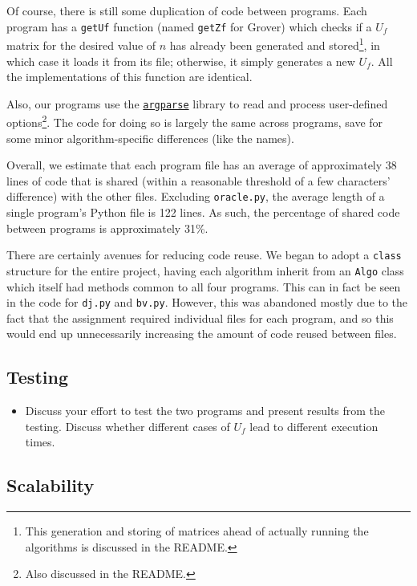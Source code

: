 \documentclass[12pt]{article}
\begin{document}
Of course, there is still some duplication of code between programs.
Each program has a \texttt{getUf} function (named \texttt{getZf} for Grover) which checks if a $U_f$ matrix for the desired value of $n$ has already been generated and stored\footnote{This generation and storing of matrices ahead of actually running the algorithms is discussed in the README.},
in which case it loads it from its file; otherwise, it simply generates a new $U_f$.
All the implementations of this function are identical.

Also, our programs use the \href{https://docs.python.org/3/library/argparse.html}{\texttt{argparse}} library \cite{python3} to read and process user-defined options\footnote{Also discussed in the README.}.
The code for doing so is largely the same across programs, save for some minor algorithm-specific differences (like the names).

Overall, we estimate that each program file has an average of approximately 38 lines of code that is shared (within a reasonable threshold of a few characters' difference) with the other files.
Excluding \texttt{oracle.py}, the average length of a single program's Python file is 122 lines.
As such, the percentage of shared code between programs is approximately 31\%.

There are certainly avenues for reducing code reuse.
We began to adopt a \texttt{class} structure for the entire project, having each algorithm inherit from an \texttt{Algo} class which itself had methods common to all four programs.
This can in fact be seen in the code for \texttt{dj.py} and \texttt{bv.py}.
However, this was abandoned mostly due to the fact that the assignment required individual files for each program, and so this would end up unnecessarily increasing the amount of code reused between files.

\subsection{Testing}

\begin{itemize}
    \item Discuss your effort to test the two programs and present results from the testing.  Discuss whether different cases of $U_f$ lead to different execution times.
\end{itemize}

\subsection{Scalability}
\end{document}
